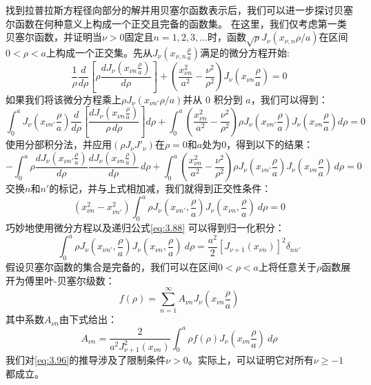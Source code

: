 \documentclass[lang=cn,10pt,newtx,bibend=biber,device=pad]{elegantbook}
\begin{document}
找到拉普拉斯方程径向部分的解并用贝塞尔函数表示后，我们可以进一步探讨贝塞尔函数在何种意义上构成一个正交且完备的函数集。
在这里，我们仅考虑第一类贝塞尔函数，并证明当$\nu > 0$固定且$n = 1,2,3,\dots$时，函数$\sqrt{\rho}J_\nu(x_{\nu,n}\rho/a)$在区间$0<\rho<a$上构成一个正交集。先从$J_\nu(x_{\nu,n}\frac{\rho}{a})$满足的微分方程开始:
\begin{equation}
    \frac{1}{\rho} \frac{d}{d\rho} \left[ \rho \frac{dJ_\nu\left( x_{\nu n} \frac{\rho}{a} \right)}{d\rho} \right] + \left( \frac{x_{\nu n}^2}{a^2} - \frac{\nu^2}{\rho^2} \right) J_\nu\left( x_{\nu n} \frac{\rho}{a} \right) = 0
\end{equation}
如果我们将该微分方程乘上$\rho J_\nu(x_{\nu n'}\rho/a)$并从 0 积分到 $a$，我们可以得到：
\[
\int_0^a J_\nu\left(x_{\nu n'} \frac{\rho}{a}\right) \frac{d}{d\rho} 
\left[
\frac{dJ_\nu\left(x_{\nu n} \frac{\rho}{a}\right)}{\rho \, d\rho}
\right] d\rho
+ \int_0^a \left( \frac{x_{\nu n}^2}{a^2} - \frac{\nu^2}{\rho^2} \right) \rho J_\nu\left(x_{\nu n'} \frac{\rho}{a}\right) J_\nu\left(x_{\nu n} \frac{\rho}{a}\right) d\rho = 0
\]
使用分部积分法，并应用$(\rho J_\nu J'_\nu)$在$\rho = 0$和$a$处为0，得到以下的结果：
\[
- \int_0^a \rho \frac{dJ_\nu\left(x_{\nu n'} \frac{\rho}{a}\right)}{d\rho}
\frac{dJ_\nu\left(x_{\nu n} \frac{\rho}{a}\right)}{d\rho} \, d\rho
+ \int_0^a \left( \frac{x_{\nu n}^2}{a^2} - \frac{\nu^2}{\rho^2} \right)
\rho J_\nu\left(x_{\nu n'} \frac{\rho}{a}\right) J_\nu\left(x_{\nu n} \frac{\rho}{a}\right) \, d\rho = 0
\]
交换$n$和$n'$的标记，并与上式相加减，我们就得到正交性条件：
\begin{equation}\label{eq:3.94}
    (x_{\nu n}^2 - x_{\nu n'}^2)\int_0^a \rho J_\nu(x_{\nu n'},\frac{\rho}{a})J_\nu(x_{\nu n},\frac{\rho}{a})\ d\rho = 0
\end{equation}
巧妙地使用微分方程以及递归公式\ref{eq:3.88} 可以得到归一化积分：
\begin{equation}\label{eq:3.95}
    \int_0^a \rho J_\nu(x_{\nu n'},\frac{\rho}{a})J_\nu(x_{\nu n},\frac{\rho}{a})\ d\rho = \frac{a^2}{2} \left[ J_{\nu+1}(x_{\nu n}) \right]^2 \delta_{nn'}
\end{equation}
假设贝塞尔函数的集合是完备的，我们可以在区间$0<\rho<a$上将任意关于$\rho$函数展开为傅里叶-贝塞尔级数：
\begin{equation}\label{eq:3.96}
    f(\rho) = \sum_{n=1}^{\infty} A_{\nu n}  J_\nu(x_{\nu n}\frac{\rho}{a})
\end{equation}
其中系数$A_{\nu n}$由下式给出：
\begin{equation}\label{eq:3.97}
    A_{\nu n} = \frac{2}{a^2 J_{\nu+1}^2(x_{\nu n})} \int_0^a \rho f(\rho) J_\nu(x_{\nu n}\frac{\rho}{a})\ d\rho
\end{equation}
我们对\ref{eq:3.96}的推导涉及了限制条件$\nu > 0$。实际上，可以证明它对所有$\nu \geq  -1$都成立。
\end{document}
